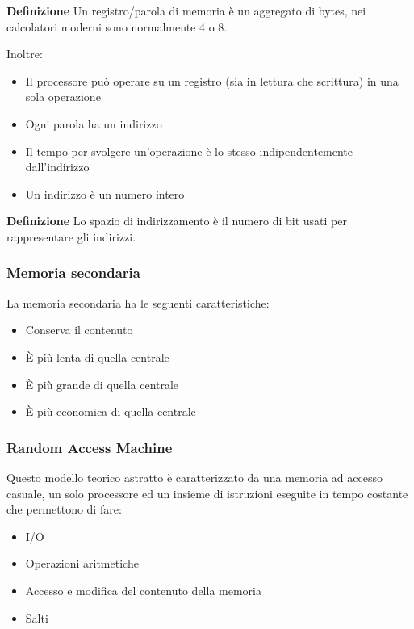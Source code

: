 \documentclass{article}
\begin{document}
\noindent\textbf{Definizione} Un registro/parola di memoria è un aggregato di bytes, nei calcolatori moderni sono normalmente 4 o 8.\newline

\noindent Inoltre:
\begin{itemize}
    \item Il processore può operare su un registro (sia in lettura che scrittura) in una sola operazione
    \item Ogni parola ha un indirizzo 
    \item Il tempo per svolgere un'operazione è lo stesso indipendentemente dall'indirizzo
    \item Un indirizzo è un numero intero\newline
\end{itemize}

\noindent\textbf{Definizione} Lo spazio di indirizzamento è il numero di bit usati per rappresentare gli indirizzi.

\subsubsection{Memoria secondaria} 

La memoria secondaria ha le seguenti caratteristiche:
\begin{itemize}
    \item Conserva il contenuto
    \item È più lenta di quella centrale
    \item È più grande di quella centrale
    \item È più economica di quella centrale
\end{itemize}

\subsubsection{Random Access Machine}

Questo modello teorico astratto è caratterizzato da una memoria ad accesso casuale, un solo processore ed un insieme di istruzioni eseguite in tempo costante che permettono di fare:
\begin{itemize}
    \item I/O
    \item Operazioni aritmetiche
    \item Accesso e modifica del contenuto della memoria
    \item Salti
\end{itemize}
\end{document}
